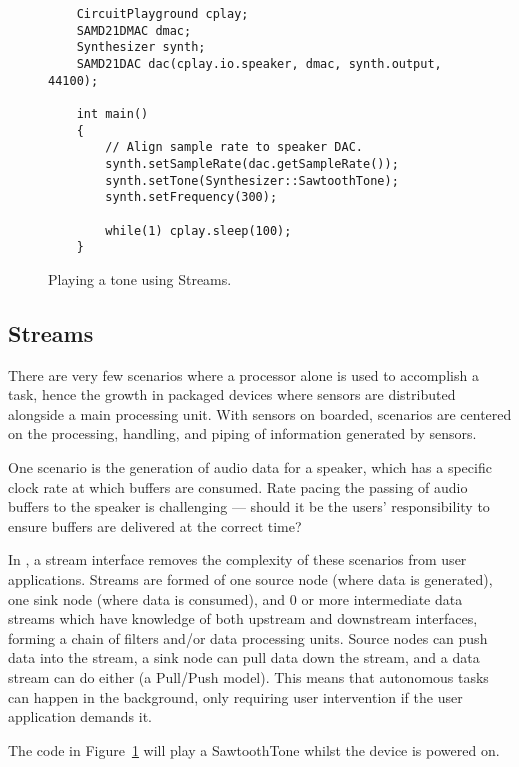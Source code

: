 \begin{figure}
    \begin{lstlisting}
    CircuitPlayground cplay;
    SAMD21DMAC dmac;
    Synthesizer synth;
    SAMD21DAC dac(cplay.io.speaker, dmac, synth.output, 44100);
    
    int main()
    {
        // Align sample rate to speaker DAC.
        synth.setSampleRate(dac.getSampleRate());
        synth.setTone(Synthesizer::SawtoothTone);
        synth.setFrequency(300);
    
        while(1) cplay.sleep(100);
    }
    \end{lstlisting}
    \caption{\label{fig:play}Playing a tone using Streams.}
    \end{figure}
    
    \subsection{Streams}
    There are very few scenarios where a processor alone is used to accomplish a task, hence the growth in packaged devices where sensors are distributed alongside a main processing unit. With sensors on boarded, scenarios are centered on the processing, handling, and piping of information generated by sensors.
    
    One scenario is the generation of audio data for a speaker, which has a specific clock rate at which buffers are consumed. Rate pacing the passing of audio buffers to the speaker is challenging --- should it be the users' responsibility to ensure buffers are delivered at the correct time?
    
    In \CON, a stream interface removes the complexity of these scenarios from user applications. Streams are formed of one source node (where data is generated), one sink node (where data is consumed), and 0 or more intermediate data streams which have knowledge of both upstream and downstream interfaces, forming a chain of filters and/or data processing units. Source nodes can push data into the stream, a sink node can pull data down the stream, and a data stream can do either (a Pull/Push model). This means that autonomous tasks can happen in the background, only requiring user intervention if the user application demands it.
    
    The code in Figure~\ref{fig:play} will play a SawtoothTone whilst the device is powered on.